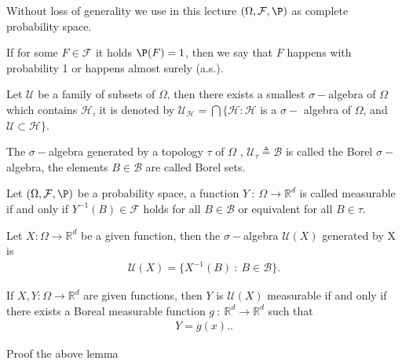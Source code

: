\vskip5mm
Without loss of generality we use in this lecture $(\Omega ,\mathcal{F},\P)$
as complete probability space.
\begin{definition}
  If for some $F \in  \mathcal{F}$ it holds $\P(F) = 1$, then we say that $F$ happens with 
  probability 1 or happens almost surely (a.s.).
\end{definition}
\begin{remark}
 Let $\mathcal{U}$  be a family of subsets of $\Omega$, then there exists a smallest $\sigma-$algebra of 
 $\Omega$ which contains $\mathcal{H}$, it is denoted by $\mathcal{U}_{\mathcal{H}} = \bigcap \{\mathcal{H}: \mathcal{H} $ is a $\sigma-$ algebra of $\Omega$, and $\mathcal{U}\subset\mathcal{H}\}$.
 \end{remark}
\begin{example}
  The $\sigma-$algebra generated by a topology $\tau $ of $\Omega$ , $\mathcal{U}_{\tau } \triangleq \mathcal{B}$ is called 
  the Borel $\sigma-$algebra, the elements $B \in  \mathcal{B}$ are called Borel sets.
\end{example}
\begin{definition}
 Let $(\Omega ,\mathcal{F},\P)$  be a probability space, a function 
$ Y \ : \ \Omega  \to \mathbb{R}^{d} $ 
 is called measurable if and only if $  Y^{-1}(B) \in  \mathcal{F} $ 
 holds for all $B \in  \mathcal{B}$ or equivalent for all $B \in  \tau $.
\end{definition}
\begin{example}
 Let $X : \Omega  \to  \mathbb{R}^{d} $  be a given function, then the $\sigma-$algebra $\mathcal{U}(X)$ generated by X is 
 \begin{align*}
  \mathcal{U}(X) = \{X^{-1}(B) \ : \ B \in  \mathcal{B} \}  
 .\end{align*}
\end{example}
\begin{lemma}
 If $X,Y :  \Omega  \to \mathbb{R}^{d} $  are given functions, then $Y$ is $\mathcal{U}(X)$ measurable if and only if 
 there exists a Boreal measurable function $g \ : \ \mathbb{R}^{d} \to  \mathbb{R}^{d}  $ such that 
 \begin{align*}
  Y = g(x).
 .\end{align*}
\end{lemma}
\begin{exercise}
  Proof the above lemma
\end{exercise}

